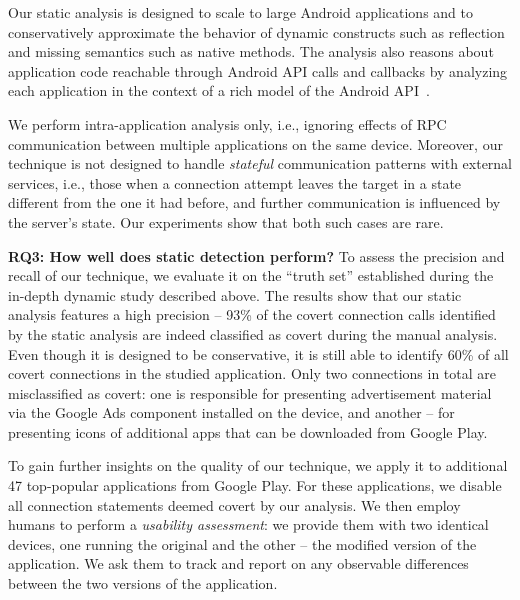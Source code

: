 
Our static analysis is designed to scale to large Android applications
and to conservatively approximate the behavior of dynamic constructs
such as reflection and missing semantics such as native methods.  The
analysis also reasons about application code reachable through Android
API calls and callbacks by analyzing each application in the context
of a rich model of the Android
API~\cite{Gordon:Kim:Perkins:Gilham:Nguyen:Rinard:NDSS15}. 

We perform intra-application analysis only, i.e., ignoring effects of RPC communication between multiple applications on the same device. Moreover, our technique is not designed to handle
\emph{stateful} communication patterns with external services, i.e., those when a connection attempt leaves the target in a state different from the one it had before, and further communication is influenced by the server's state. Our experiments show that both such cases are rare. 

\noindent 
{\bf RQ3: How well does static detection perform?}
To assess the precision and recall of our technique, we evaluate it on the ``truth set'' established during the in-depth dynamic study described above. %
The results show that our static analysis features a high precision -- 93\% of the covert connection calls identified by the static analysis are indeed classified as covert during the manual analysis. Even though it is designed to be conservative, it is still able to identify 60\% of all covert connections in the studied application.
Only two connections in total are misclassified as covert: one is responsible for presenting advertisement material via the Google Ads component installed on the device, and another -- for presenting icons of additional apps that can be downloaded from Google Play. 

To gain further insights on the quality of our technique, we apply it to additional 47 top-popular applications from Google Play. For these applications, we disable all connection statements deemed covert by our analysis. We then employ humans to perform a \emph{usability assessment}: we provide them with two identical devices, one running the original and the other -- the modified version of the application. We ask them to track and report on any observable differences between the two versions of the application. 

